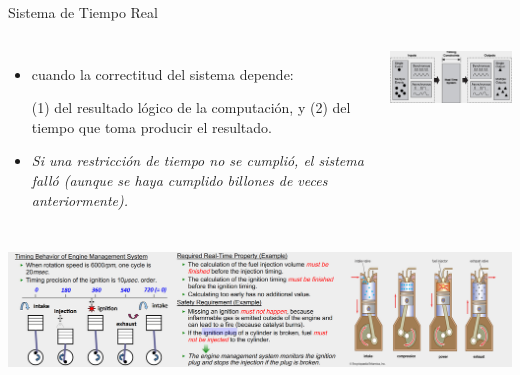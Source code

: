 \documentclass[8pt,aspectratio=169,compress]{beamer}
\begin{document}
\begin{frame}{Sistema de Tiempo Real}

   \begin{columns}[onlytextwidth,T]
     \column{\dimexpr\linewidth-70mm-5mm}

\begin{itemize}
  \item[REAL-TIME-SYSTEM] cuando la correctitud del sistema depende:

\bigskip
(1) del resultado lógico de la computación, y
\bigskip
(2) del tiempo que toma producir el resultado.

\bigskip
  \item[FALLO] \textit{Si una restricción de tiempo no se cumplió, el sistema falló (aunque se haya cumplido billones de veces anteriormente).}

\end{itemize}

      \column{70mm}
    \includegraphics[width=70mm]{images/rts.jpg}

    \end{columns}
\bigskip
    \includegraphics[width=140mm]{images/ejemplo1.jpg}

\end{frame}
\end{document}
